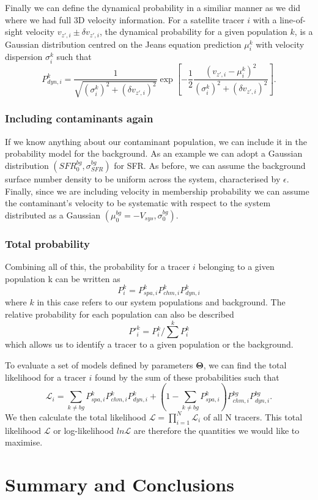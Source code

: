Finally we can define the dynamical probability in a similiar manner as we did where we had full 3D velocity information. For a satellite tracer $i$ with a line-of-sight velocity $v_{z',i} \pm \delta v_{z',i}$, the dynamical probability for a given population $k$, is a Gaussian distribution centred on the Jeans equation prediction $\mu^k_i$ with velocity dispersion $\sigma^k_i$ such that
\begin{equation}
P^k_{dyn,i} = \frac{1}{\sqrt{(\sigma^k_i)^2+ (\delta v_{z',i})^2}} \exp{\left[-\frac{1}{2}\frac{(v_{z',i}-\mu^k_i)^2}{(\sigma^k_i)^2 + (\delta v_{z',i})^2}\right]}.
\end{equation}
\subsubsection{Including contaminants again}
If we know anything about our contaminant population, we can include it in the probability model for the background. As an example we can adopt a Gaussian distribution $(SFR_0^{bg},\sigma_{SFR}^{bg})$ for SFR. As before, we can assume the background surface number density to be uniform across the system, characterised by $\epsilon$. Finally, since we are including velocity in membership probability we can assume the contaminant's velocity to be systematic with respect to the system distributed as a Gaussian $(\mu_0^{bg}=-V_{sys},\sigma_0^{bg})$. 
\subsubsection{Total probability}
Combining all of this, the probability for a tracer $i$ belonging to a given population k can be written as
\begin{equation}
P_i^{k} = P_{spa,i}^k P_{chm,i}^k P_{dyn,i}^k 
\end{equation}
where $k$ in this case refers to our system populations and background. The relative probability for each population can also be described 
\begin{equation}
P'^k_i = P^k_i / \sum^k P^k_i
\end{equation}
which allows us to identify a tracer to a given population or the background.

To evaluate a set of models defined by parameters $\boldsymbol{\Theta}$, we can find the total likelihood for a tracer $i$ found by the sum of these probabilities such that
\begin{equation}
\mathcal{L}_i = \sum_{k \neq bg} P^{k}_{spa,i} P^{k}_{chm,i} P^{k}_{dyn,i} + \left(1 - \sum_{k \neq bg} P^{k}_{spa,i} \right) P^{bg}_{chm,i} P^{bg}_{dyn,i}.
\end{equation}
We then calculate the total likelihood $\mathcal{L} = \prod^N_{i=1} \mathcal{L}_i$ of all N tracers. This total likelihood $\mathcal{L}$ or log-likelihood $ln \mathcal{L}$ are therefore the quantities we would like to maximise.

\section{Summary and Conclusions} \label{sec:dyn_mod_conclusions}